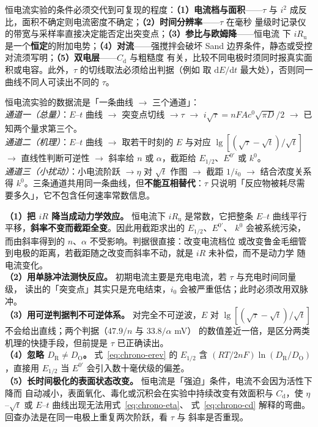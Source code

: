 \begin{measure}
恒电流实验的条件必须交代到可复现的程度：\textbf{（1）电流档与面积}——$\tau$ 与
$i^{2}$ 成反比，面积不确定则电流密度不确定；\textbf{（2）时间分辨率}——$\tau$ 在毫秒
量级时记录仪的带宽与采样率直接决定能否定出突变点；\textbf{（3）参比与欧姆降}——恒电流
下 $iR_{\mathrm{u}}$ 是一个\textbf{恒定}的附加电势；\textbf{（4）对流}——强搅拌会破坏
Sand 边界条件，静态或受控对流须写明；\textbf{（5）双电层}——$C_{\mathrm{d}}$ 与粗糙度
有关，比较不同电极时须同时报真实面积或电容。此外，$\tau$ 的切线取法必须给出判据（例如
取 $\mathrm{d}E/\mathrm{d}t$ 最大处），否则同一曲线不同人可读出不同的 $\tau$。
\end{measure}

\begin{dataflow}
恒电流实验的数据流是「一条曲线 $\to$ 三个通道」：\\
\emph{通道一（总量）}：$E$–$t$ 曲线 $\to$ 突变点切线 $\to\tau$ $\to$
$i\sqrt{\tau}=nFAc^0\sqrt{\pi D}/2$ $\to$ 已知两个量求第三个。\\
\emph{通道二（机理）}：$E$–$t$ 曲线 $\to$ 取若干时刻的 $E$ 与对应
$\lg[(\sqrt{\tau}-\sqrt{t})/\sqrt{t}]$ $\to$ 直线性判断可逆性 $\to$ 斜率给 $n$ 或
$\alpha$，截距给 $E_{1/2}$、$E^{0'}$ 或 $k^{0}$。\\
\emph{通道三（小扰动）}：小电流阶跃 $\to\eta$ 对 $\sqrt{t}$ 作图 $\to$ 截距 $1/i_0$
$\to$ 结合浓度关系得 $k^{0}$。三条通道共用同一条曲线，但\textbf{不能互相替代}：$\tau$
只说明「反应物被耗尽需要多久」，它不包含任何速率常数信息。
\end{dataflow}

\begin{pitfall}
\textbf{（1）把 $iR$ 降当成动力学效应。} 恒电流下 $iR_{\mathrm{u}}$ 是常数，它把整条
$E$–$t$ 曲线平行平移，\textbf{斜率不变而截距全变}。因此用截距求出的 $E_{1/2}$、$E^{0'}$、
$k^{0}$ 会被系统污染，而由斜率得到的 $n$、$\alpha$ 不受影响。判据很直接：改变电流档位
或改变鲁金毛细管到电极的距离，若截距随之改变而斜率不动，就是 $iR$ 未补偿，而不是动力学
随电流变化。\\
\textbf{（2）用单脉冲法测快反应。} 初期电流主要是充电电流，若 $\tau$ 与充电时间同量级，
读出的「突变点」其实只是充电结束，$i_0$ 会被严重低估；此时必须改用双脉冲。\\
\textbf{（3）用可逆判据判不可逆体系。} 对完全不可逆波，$E$ 对
$\lg[(\sqrt{\tau}-\sqrt{t})/\sqrt{t}]$ 不会给出直线；两个判据（$47.9/n$ 与 $33.8/\alpha$ mV）
的数值差近一倍，是区分两类机理的快捷手段，但前提是 $\tau$ 已正确读出。\\
\textbf{（4）忽略 $D_{\mathrm{R}}\ne D_{\mathrm{O}}$。} 式~\eqref{eq:chrono-erev} 的
$E_{1/2}$ 含 $(RT/2nF)\ln(D_{\mathrm{R}}/D_{\mathrm{O}})$，直接用 $E_{1/2}$ 当 $E^{0'}$
会引入数十毫伏级的偏差。\\
\textbf{（5）长时间极化的表面状态改变。} 恒电流是「强迫」条件，电流不会因为活性下降而
自动减小，表面氧化、毒化或沉积会在实验中持续改变有效面积与 $C_{\mathrm{d}}$，使
$\eta$–$\sqrt{t}$ 或 $E$–$t$ 曲线出现无法用式~\eqref{eq:chrono-eta}、
式~\eqref{eq:chrono-cd} 解释的弯曲。回查办法是在同一电极上重复两次阶跃，看 $\tau$ 与
斜率是否重现。
\end{pitfall}

